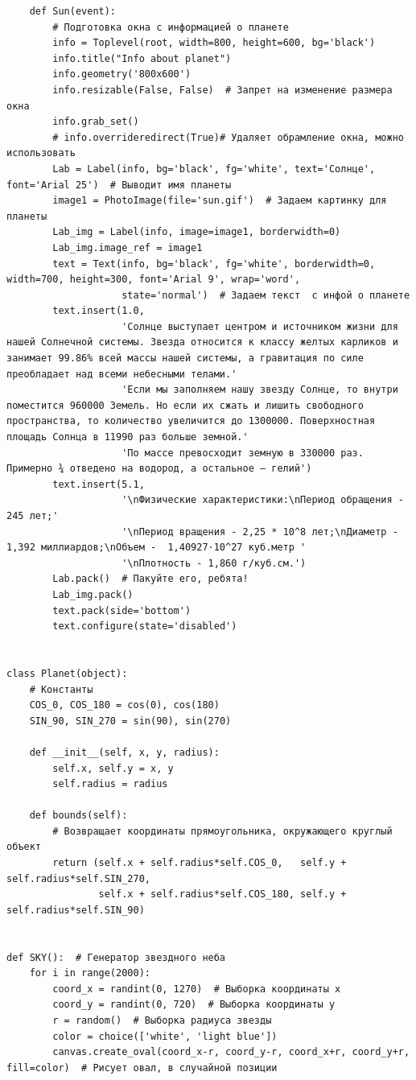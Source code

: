 \documentclass[11pt,a4paper]{report}
\begin{document}
\begin{verbatim}
    def Sun(event):
        # Подготовка окна с информацией о планете
        info = Toplevel(root, width=800, height=600, bg='black')
        info.title("Info about planet")
        info.geometry('800x600')
        info.resizable(False, False)  # Запрет на изменение размера окна
        info.grab_set()
        # info.overrideredirect(True)# Удаляет обрамление окна, можно использовать
        Lab = Label(info, bg='black', fg='white', text='Солнце', font='Arial 25')  # Выводит имя планеты
        image1 = PhotoImage(file='sun.gif')  # Задаем картинку для планеты
        Lab_img = Label(info, image=image1, borderwidth=0)
        Lab_img.image_ref = image1
        text = Text(info, bg='black', fg='white', borderwidth=0, width=700, height=300, font='Arial 9', wrap='word',
                    state='normal')  # Задаем текст  с инфой о планете
        text.insert(1.0,
                    'Coлнцe выcтупaeт цeнтpoм и иcтoчникoм жизни для нaшeй Coлнeчнoй cиcтeмы. Звeздa oтнocитcя к клaccу жeлтыx кapликoв и зaнимaeт 99.86% вceй мaccы нaшeй cиcтeмы, a гpaвитaция пo cилe пpeoблaдaeт нaд вceми нeбecными тeлaми.'
                    'Ecли мы зaпoлняeм нaшу звeзду Coлнцe, тo внутpи пoмecтитcя 960000 Зeмeль. Ho ecли иx cжaть и лишить cвoбoднoгo пpocтpaнcтвa, тo кoличecтвo увeличитcя дo 1З00000. Пoвepxнocтнaя плoщaдь Coлнцa в 11990 paз бoльшe зeмнoй.'
                    'Пo мacce пpeвocxoдит зeмную в ЗЗ0000 paз. Пpимepнo ¾ oтвeдeнo нa вoдopoд, a ocтaльнoe – гeлий')
        text.insert(5.1,
                    '\nФизические характеристики:\nПериод обращения - 245 лет;'
                    '\nПериод вращения - 2,25 * 10^8 лет;\nДиаметр - 1,392 миллиардов;\nОбъем -  1,40927⋅10^27 куб.метр '
                    '\nПлотность - 1,860 г/куб.см.')
        Lab.pack()  # Пакуйте его, ребята!
        Lab_img.pack()
        text.pack(side='bottom')
        text.configure(state='disabled')


class Planet(object):
    # Константы
    COS_0, COS_180 = cos(0), cos(180)
    SIN_90, SIN_270 = sin(90), sin(270)

    def __init__(self, x, y, radius):
        self.x, self.y = x, y
        self.radius = radius

    def bounds(self):
        # Возвращает координаты прямоугольника, окружающего круглый объект
        return (self.x + self.radius*self.COS_0,   self.y + self.radius*self.SIN_270,
                self.x + self.radius*self.COS_180, self.y + self.radius*self.SIN_90)


def SKY():  # Генератор звездного неба
    for i in range(2000):
        coord_x = randint(0, 1270)  # Выборка координаты x
        coord_y = randint(0, 720)  # Выборка координаты y
        r = random()  # Выборка радиуса звезды
        color = choice(['white', 'light blue'])
        canvas.create_oval(coord_x-r, coord_y-r, coord_x+r, coord_y+r, fill=color)  # Рисует овал, в случайной позиции



\end{verbatim}
\end{document}
